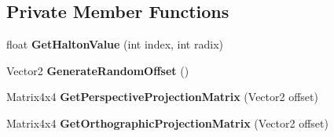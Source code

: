 \subsection*{Private Member Functions}
\begin{DoxyCompactItemize}
\item 
\mbox{\label{class_unity_engine_1_1_post_processing_1_1_taa_component_a52f3e07778893dbda232406a14963471}} 
float {\bfseries Get\+Halton\+Value} (int index, int radix)
\item 
\mbox{\label{class_unity_engine_1_1_post_processing_1_1_taa_component_a6d010d7cefe4fe2b6a53ae8be9d80717}} 
Vector2 {\bfseries Generate\+Random\+Offset} ()
\item 
\mbox{\label{class_unity_engine_1_1_post_processing_1_1_taa_component_a5e3bfb75e11150ced64c681cc4ba3eae}} 
Matrix4x4 {\bfseries Get\+Perspective\+Projection\+Matrix} (Vector2 offset)
\item 
\mbox{\label{class_unity_engine_1_1_post_processing_1_1_taa_component_aca66e3898265851f2a8ef711866c760f}} 
Matrix4x4 {\bfseries Get\+Orthographic\+Projection\+Matrix} (Vector2 offset)
\end{DoxyCompactItemize}
